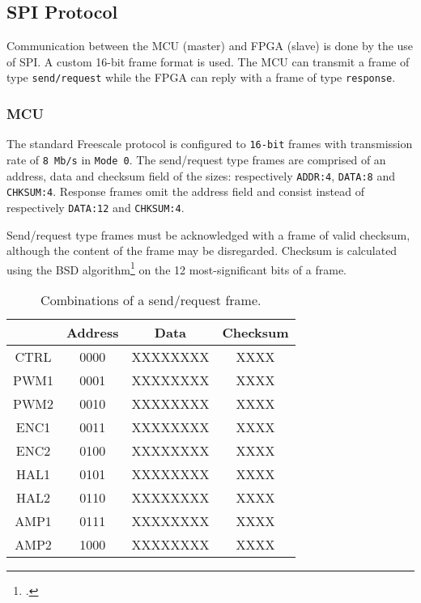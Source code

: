\subsection{SPI Protocol}
Communication between the MCU (master) and FPGA (slave) is done by the use of SPI. A custom 16-bit frame format is used. The MCU can transmit a frame of type \texttt{send/request} while the FPGA can reply with a frame of type \texttt{response}.\medskip

\subsubsection{MCU}
The standard Freescale protocol is configured to \texttt{16-bit} frames with transmission rate of \texttt{8 Mb/s} in \texttt{Mode 0}. The send/request type frames are comprised of an address, data and checksum field of the sizes: respectively \texttt{ADDR:4}, \texttt{DATA:8} and \texttt{CHKSUM:4}. Response frames omit the address field and consist instead of respectively \texttt{DATA:12} and \texttt{CHKSUM:4}.\medskip

Send/request type frames must be acknowledged with a frame of valid checksum, although the content of the frame may be disregarded. Checksum is calculated using the BSD algorithm\footcite[]{bsd_wiki} on the 12 most-significant bits of a frame.\medskip

\begin{table}[ht!]
\centering
\begin{tabular}{|c|c|c|c|}
\hline
\multicolumn{1}{|l|}{} & Address & Data     & Checksum \\ \hline
CTRL                   & 0000    & XXXXXXXX & XXXX     \\ \hline
PWM1                   & 0001    & XXXXXXXX & XXXX     \\ \hline
PWM2                   & 0010    & XXXXXXXX & XXXX     \\ \hline
ENC1                   & 0011    & XXXXXXXX & XXXX     \\ \hline
ENC2                   & 0100    & XXXXXXXX & XXXX     \\ \hline
HAL1                   & 0101    & XXXXXXXX & XXXX     \\ \hline
HAL2                   & 0110    & XXXXXXXX & XXXX     \\ \hline
AMP1                   & 0111    & XXXXXXXX & XXXX     \\ \hline
AMP2                   & 1000    & XXXXXXXX & XXXX     \\ \hline
\end{tabular}
\caption{Combinations of a send/request frame.}
\label{tab: spi_1}
\end{table}

